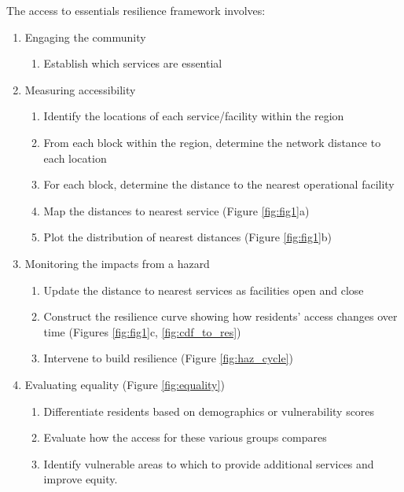 \documentclass[9pt,twocolumn,twoside,lineno]{pnas-new}
\begin{document}
The access to essentials resilience framework involves: 
\begin{enumerate}
    \item Engaging the community 
    \begin{enumerate}
        \item Establish which services are essential
    \end{enumerate}
    \item Measuring accessibility \begin{enumerate}
        \item Identify the locations of each service/facility within the region
        \item From each block within the region, determine the network distance to each location
        \item For each block, determine the distance to the nearest operational facility
        \item Map the distances to nearest service (Figure \ref{fig:fig1}a)
        \item Plot the distribution of nearest distances (Figure \ref{fig:fig1}b)
    \end{enumerate}
    \item Monitoring the impacts from a hazard
    \begin{enumerate}
        \item Update the distance to nearest services as facilities open and close
        \item Construct the resilience curve showing how residents' access changes over time (Figures \ref{fig:fig1}c, \ref{fig:cdf_to_res})
        \item Intervene to build resilience (Figure \ref{fig:haz_cycle})
    \end{enumerate}
    \item Evaluating equality (Figure \ref{fig:equality})
    \begin{enumerate}
        \item Differentiate residents based on demographics or vulnerability scores
        \item Evaluate how the access for these various groups compares
        \item Identify vulnerable areas to which to provide additional services and improve equity.
    \end{enumerate}
\end{enumerate}
\end{document}
